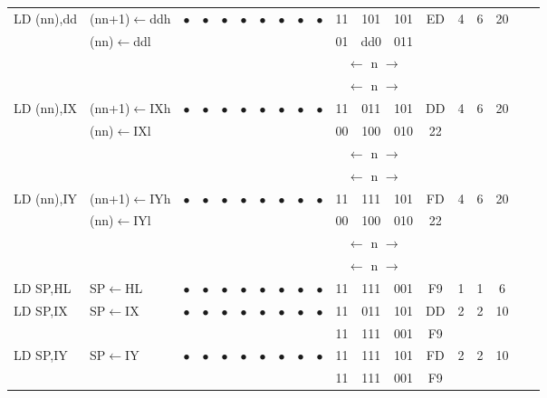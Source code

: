 \documentclass[oneside,a4paper]{book}
\begin{document}
{\begin{tabular}{llc@{ }c@{ }c@{ }c@{ }c@{ }c@{ }c@{ }cc@{ }c@{ }cccccll}
LD (nn),dd & (nn+1)$\leftarrow$ddh &
	$\bullet$ & $\bullet$ & $\bullet$ & $\bullet$ & $\bullet$ & $\bullet$ & $\bullet$ & $\bullet$ & 11 & 101 & 101 
	& ED & 4 & 6 & 20 & & \\ 
           & (nn)$\leftarrow$ddl & \multicolumn{8}{c}{} & 01 & dd0 & 011 & \multicolumn{4}{c}{} & & \\
\multicolumn{10}{c}{} & \multicolumn{3}{c}{$\leftarrow$ n $\rightarrow$} & \multicolumn{4}{c}{} & & \\
\multicolumn{10}{c}{} & \multicolumn{3}{c}{$\leftarrow$ n $\rightarrow$} & \multicolumn{4}{c}{} & & \\

LD (nn),IX & (nn+1)$\leftarrow$IXh &
	$\bullet$ & $\bullet$ & $\bullet$ & $\bullet$ & $\bullet$ & $\bullet$ & $\bullet$ & $\bullet$ & 11 & 011 & 101 
	& DD & 4 & 6 & 20 & & \\ 
           & (nn)$\leftarrow$IXl & \multicolumn{8}{c}{} & 00 & 100 & 010 & 22 & \multicolumn{3}{c}{} & & \\
\multicolumn{10}{c}{} & \multicolumn{3}{c}{$\leftarrow$ n $\rightarrow$} & \multicolumn{4}{c}{} & & \\
\multicolumn{10}{c}{} & \multicolumn{3}{c}{$\leftarrow$ n $\rightarrow$} & \multicolumn{4}{c}{} & & \\

LD (nn),IY & (nn+1)$\leftarrow$IYh &
	$\bullet$ & $\bullet$ & $\bullet$ & $\bullet$ & $\bullet$ & $\bullet$ & $\bullet$ & $\bullet$ & 11 & 111 & 101 
	& FD & 4 & 6 & 20 & & \\ 
           & (nn)$\leftarrow$IYl & \multicolumn{8}{c}{} & 00 & 100 & 010 & 22 & \multicolumn{3}{c}{} & & \\
\multicolumn{10}{c}{} & \multicolumn{3}{c}{$\leftarrow$ n $\rightarrow$} & \multicolumn{4}{c}{} & & \\
\multicolumn{10}{c}{} & \multicolumn{3}{c}{$\leftarrow$ n $\rightarrow$} & \multicolumn{4}{c}{} & & \\

LD SP,HL & SP$\leftarrow$HL & 
	$\bullet$ & $\bullet$ & $\bullet$ & $\bullet$ & $\bullet$ & $\bullet$ & $\bullet$ & $\bullet$ & 11 & 111 & 001
	& F9 & 1 & 1 & 6 & & \\ 

LD SP,IX & SP$\leftarrow$IX & 
	$\bullet$ & $\bullet$ & $\bullet$ & $\bullet$ & $\bullet$ & $\bullet$ & $\bullet$ & $\bullet$ & 11 & 011 & 101
	& DD & 2 & 2 & 10 & & \\ 
\multicolumn{10}{c}{} & 11 & 111 & 001 & F9 & \multicolumn{3}{c}{} & & \\

LD SP,IY & SP$\leftarrow$IY & 
	$\bullet$ & $\bullet$ & $\bullet$ & $\bullet$ & $\bullet$ & $\bullet$ & $\bullet$ & $\bullet$ & 11 & 111 & 101
	& FD & 2 & 2 & 10 & & \\ 
\multicolumn{10}{c}{} & 11 & 111 & 001 & F9 & \multicolumn{3}{c}{} & & \\  \hline

\end{tabular}
}
\end{document}
